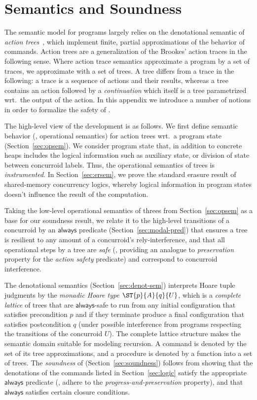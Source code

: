 \section{Semantics and Soundness}
\label{sec:semantics}

The semantic model for \SCST programs largely relies on the
denotational semantic of \emph{action
  trees}~\cite{LeyWild-Nanevski:POPL13}, which implement finite,
partial approximations of the behavior of \SCST commands.  Action
trees are a generalization of the Brookes' action traces in the
following sense. Where action trace semantics approximate a program by
a set of traces, we approximate with a set of trees. A tree differs
from a trace in the following: a trace is a sequence of actions and
their results, whereas a tree contains an action followed by a
\emph{continuation} which itself is a tree parametrized wrt.~the
output of the action. In this appendix we introduce a number of
notions in order to formalize the safety of \SCST.

The high-level view of the development is as follows. We first define
semantic behavior (\ie, operational semantics) for action trees wrt.~a
program state (Section~\ref{sec:opsem}). We consider program state
that, in addition to concrete heaps includes the logical information
such as auxiliary state, or division of state between concurroid
labels. Thus, the operational semantics of trees is
\emph{instrumented}. In Section~\ref{sec:ersem}, we prove the standard
erasure result of shared-memory concurrency logics, whereby logical
information in program states doesn't influence the result of the
computation.

Taking the low-level operational semantics of threes from
Section~\ref{sec:opsem} as a base for our soundness result, we relate
it to the high-level transitions of a concurroid by an
$\mathsf{always}$ predicate (Section~\ref{sec:modal-pred}) that
ensures a tree is resilient to any amount of a concurroid's
rely-interference, and that all operational steps by a tree are
\emph{safe} (\ie, providing an analogue to \emph{preservation}
property for the \emph{action safety} predicate) and correspond to
concurroid interference. %

The denotational semantics (Section~\ref{sec:denot-sem}) interprets
Hoare tuple judgments by the \emph{monadic Hoare type}
$\ST{p}{A}{q}{U}$, which is a \emph{complete lattice} of trees that
are $\mathsf{always}$-safe to run from any initial configuration that
satisfies precondition $p$ and if they terminate produce a final
configuration that satisfies postcondition $q$ (under possible
interference from programs respecting the transitions of the
concurroid $U$). The complete lattice structure makes the semantic
domain suitable for modeling recursion.  A command is denoted by the
set of its tree approximations, and a procedure is denoted by a
function into a set of trees.
%
The \emph{soundness} of \SCST (Section~\ref{sec:soundness}) follows
from showing that the denotations of the commands listed in
Section~\ref{sec:logic} satisfy the appropriate $\mathsf{always}$
predicate (\ie, adhere to the \emph{progress-and-preservation}
property), and that $\mathsf{always}$ satisfies certain closure
conditions. 

